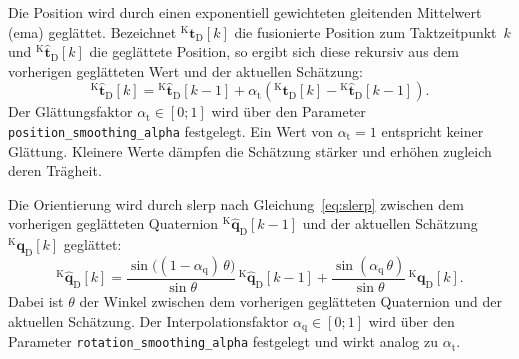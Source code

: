 Die Position wird durch einen exponentiell gewichteten gleitenden Mittelwert (\gls{ema}) geglättet.
Bezeichnet $^{\mathrm{K}}\mathbf{t}_{\mathrm{D}}[k]$ die fusionierte Position zum Taktzeitpunkt~$k$ und $^{\mathrm{K}}\hat{\mathbf{t}}_{\mathrm{D}}[k]$ die geglättete Position, so ergibt sich diese rekursiv aus dem vorherigen geglätteten Wert und der aktuellen Schätzung:
\begin{equation}
^{\mathrm{K}}\hat{\mathbf{t}}_{\mathrm{D}}[k] = {^{\mathrm{K}}\hat{\mathbf{t}}_{\mathrm{D}}[k-1]} + \alpha_{\mathrm{t}}\left({^{\mathrm{K}}\mathbf{t}_{\mathrm{D}}[k]} - {^{\mathrm{K}}\hat{\mathbf{t}}_{\mathrm{D}}[k-1]}\right).
\label{eq:pos_ema}
\end{equation}
Der Glättungsfaktor $\alpha_{\mathrm{t}} \in [0;1]$ wird über den Parameter \texttt{position\_smoothing\_alpha} festgelegt.
Ein Wert von $\alpha_{\mathrm{t}} = 1$ entspricht keiner Glättung. 
Kleinere Werte dämpfen die Schätzung stärker und erhöhen zugleich deren Trägheit.

Die Orientierung wird durch \gls{slerp} nach Gleichung~\ref{eq:slerp} zwischen dem vorherigen geglätteten Quaternion $^{\mathrm{K}}\hat{\mathbf{q}}_{\mathrm{D}}[k-1]$ 
und der aktuellen Schätzung $^{\mathrm{K}}\mathbf{q}_{\mathrm{D}}[k]$ geglättet:
\begin{equation}
^{\mathrm{K}}\hat{\mathbf{q}}_{\mathrm{D}}[k] = \frac{\sin\!\bigl((1-\alpha_{\mathrm{q}})\,\theta\bigr)}{\sin\theta}\,{^{\mathrm{K}}\hat{\mathbf{q}}_{\mathrm{D}}[k-1]} + \frac{\sin(\alpha_{\mathrm{q}}\,\theta)}{\sin\theta}\,{^{\mathrm{K}}\mathbf{q}_{\mathrm{D}}[k]}.
\label{eq:pos_slerp}
\end{equation}
Dabei ist $\theta$ der Winkel zwischen dem vorherigen geglätteten Quaternion und der aktuellen Schätzung.
Der Interpolationsfaktor $\alpha_{\mathrm{q}} \in [0;1]$ wird über den Parameter \texttt{rotation\_smoothing\_alpha} 
festgelegt und wirkt analog zu $\alpha_{\mathrm{t}}$.

